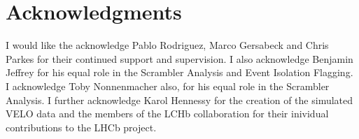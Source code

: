 \section{Acknowledgments}
	I would like the acknowledge Pablo Rodriguez, Marco Gersabeck and Chris Parkes for their continued support and supervision.
	I also acknowledge Benjamin Jeffrey for his equal role in the Scrambler Analysis and Event Isolation Flagging.
	I acknowledge Toby Nonnenmacher also, for his equal role in the Scrambler Analysis.
	I further acknowledge Karol Hennessy for the creation of the simulated VELO data and the members of the LCHb collaboration for their inividual contributions to the LHCb project.